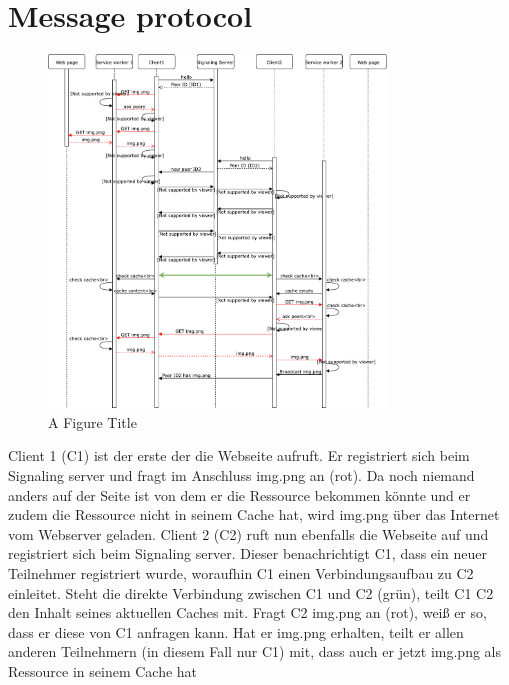 \subsection{\schulCloud}

\section{Message protocol}

\begin{figure}[!h]
	\centering
	\includegraphics[width=0.8\textwidth]{figures/SequenceDiagram}
	\caption[A Figure Short-Title]{A Figure Title}
	\label{fig:sequenceDiagram}
\end{figure}

Client 1 (C1) ist der erste der die Webseite aufruft. Er registriert sich beim Signaling server und fragt im Anschluss img.png an (rot). Da noch niemand anders auf der Seite ist von dem er die Ressource bekommen könnte und er zudem die Ressource nicht in seinem Cache hat, wird img.png über das Internet vom Webserver geladen. Client 2 (C2) ruft nun ebenfalls die Webseite auf und registriert sich beim Signaling server. Dieser benachrichtigt C1, dass ein neuer Teilnehmer registriert wurde, woraufhin C1 einen Verbindungsaufbau zu C2 einleitet. Steht die direkte Verbindung zwischen C1 und C2 (grün), teilt C1 C2 den Inhalt seines aktuellen Caches mit. Fragt C2 img.png an (rot), weiß er so, dass er diese von C1 anfragen kann. Hat er img.png erhalten, teilt er allen anderen Teilnehmern (in diesem Fall nur C1) mit, dass auch er jetzt img.png als Ressource in seinem Cache hat

